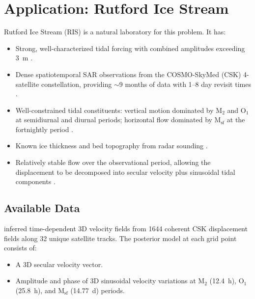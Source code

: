 \documentclass[11pt,letterpaper]{article}
\begin{document}
\section{Application: Rutford Ice Stream}
\label{sec:rutford}

Rutford Ice Stream (RIS) is a natural laboratory for this problem.  It has:
\begin{itemize}
  \item Strong, well-characterized tidal forcing with combined amplitudes exceeding 3~m \citep{Padman2002,Han2005}.
  \item Dense spatiotemporal SAR observations from the COSMO-SkyMed (CSK) 4-satellite constellation, providing $\sim$9 months of data with 1--8 day revisit times \citep{Minchew2017}.
  \item Well-constrained tidal constituents: vertical motion dominated by M$_2$ and O$_1$ at semidiurnal and diurnal periods; horizontal flow dominated by M$_{\text{sf}}$ at the fortnightly period \citep{Gudmundsson2006,Murray2007,Minchew2017}.
  \item Known ice thickness and bed topography from radar sounding \citep{Fretwell2013,King2016}.
  \item Relatively stable flow over the observational period, allowing the displacement to be decomposed into secular velocity plus sinusoidal tidal components \citep{Minchew2017}.
\end{itemize}

\subsection{Available Data}
\label{sec:rutford_data}

\citet{Minchew2017} inferred time-dependent 3D velocity fields from 1644 coherent CSK displacement fields along 32 unique satellite tracks.  The posterior model at each grid point consists of:
\begin{itemize}
  \item A 3D secular velocity vector.
  \item Amplitude and phase of 3D sinusoidal velocity variations at M$_2$ (12.4~h), O$_1$ (25.8~h), and M$_{\text{sf}}$ (14.77~d) periods.
\end{itemize}
\end{document}
